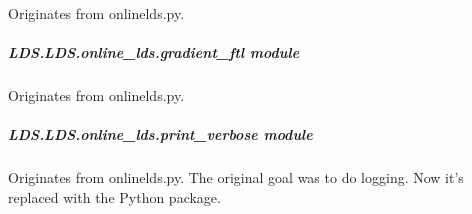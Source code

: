 \documentclass[letterpaper,10pt,english]{sphinxmanual}
\begin{document}
\begin{fulllineitems}
\label{\detokenize{LDS.LDS.online_lds:LDS.LDS.online_lds.cost_ftl.cost_ftl}}
\sphinxAtStartPar
Originates from onlinelds.py.

\end{fulllineitems}



\subparagraph{LDS.LDS.online\_lds.gradient\_ftl module}
\label{\detokenize{LDS.LDS.online_lds:module-LDS.LDS.online_lds.gradient_ftl}}\label{\detokenize{LDS.LDS.online_lds:lds-lds-online-lds-gradient-ftl-module}}

\begin{fulllineitems}
\label{\detokenize{LDS.LDS.online_lds:LDS.LDS.online_lds.gradient_ftl.gradient_ftl}}
\sphinxAtStartPar
Originates from onlinelds.py.

\end{fulllineitems}



\subparagraph{LDS.LDS.online\_lds.print\_verbose module}
\label{\detokenize{LDS.LDS.online_lds:module-LDS.LDS.online_lds.print_verbose}}\label{\detokenize{LDS.LDS.online_lds:lds-lds-online-lds-print-verbose-module}}

\begin{fulllineitems}
\label{\detokenize{LDS.LDS.online_lds:LDS.LDS.online_lds.print_verbose.print_verbose}}
\sphinxAtStartPar
Originates from onlinelds.py. The original goal was to do logging.
Now it’s replaced with the Python package.

\end{fulllineitems}
\end{document}
